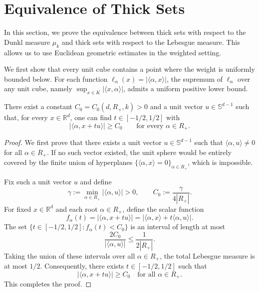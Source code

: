 \documentclass[12pt]{article}
\begin{document}
\section{Equivalence of Thick Sets}
\label{sec:thick-equivalence}

In this section, we prove the equivalence between thick sets with respect to the Dunkl measure $\mu_k$ and thick sets with respect to the Lebesgue measure. %
This allows us to use Euclidean geometric estimates in the weighted setting.

We first show that every unit cube contains a point where the weight is uniformly bounded below. For each function $\ell_\alpha(x)=|\langle \alpha,x\rangle|$, the supremum of $\ell_\alpha$ over any unit cube, namely $\sup_{x\in K} |\langle x,\alpha\rangle|$, admits a uniform positive lower bound.

\begin{lemma}
\label{lem:lower-bound}
There exist a constant $C_0=C_0(d,R_+,k)>0$ and a unit vector $u\in\mathbb{S}^{d-1}$ such that, for every $x\in\mathbb{R}^d$, one can find $t\in[-1/2,1/2]$ with
\[
|\langle\alpha,x+tu\rangle|\ge C_0\qquad\text{for every }\alpha\in R_+.
\]
\end{lemma}

\begin{proof}
We first prove that there exists a unit vector $u \in \mathbb{S}^{d-1}$ such that $\langle \alpha, u \rangle \neq 0$ for all $\alpha \in R_+$. If no such vector existed, the unit sphere would be entirely covered by the finite union of hyperplanes $\{\langle \alpha, x \rangle = 0\}_{\alpha \in R_+}$, which is impossible.

Fix such a unit vector $u$ and define
\[
\gamma := \min_{\alpha \in R_+} |\langle \alpha, u \rangle| > 0, \qquad C_0 := \frac{\gamma}{4|R_+|}.
\]
For fixed $x \in \mathbb{R}^d$ and each root $\alpha \in R_+$, define the scalar function
\[
f_\alpha(t) = |\langle \alpha, x + tu \rangle| = \bigl|\langle \alpha, x \rangle + t\langle \alpha, u \rangle\bigr|.
\]
The set $\{ t \in [-1/2,1/2] : f_\alpha(t) < C_0 \}$ is an interval of length at most
\[
\frac{2C_0}{|\langle \alpha, u \rangle|} \leq \frac{1}{2|R_+|}.
\]
Taking the union of these intervals over all $\alpha \in R_+$, the total Lebesgue measure is at most $1/2$. Consequently, there exists $t \in [-1/2, 1/2]$ such that
\[
|\langle \alpha, x + tu \rangle| \geq C_0 \quad \text{for all } \alpha \in R_+.
\]
This completes the proof.
\end{proof}
\end{document}
